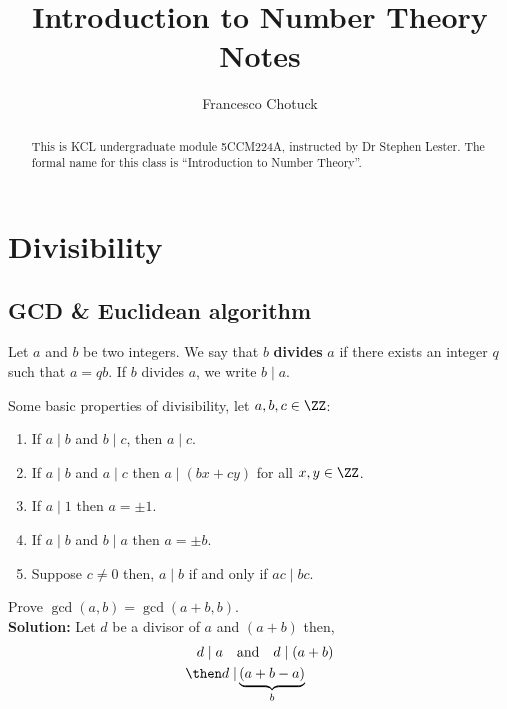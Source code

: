 \documentclass[12pt, a4paper]{article}
\title{Introduction to Number Theory Notes}
\date{}
\author{Francesco Chotuck}
\begin{document}
\maketitle

\begin{abstract}
    This is KCL undergraduate module 5CCM224A, instructed by Dr Stephen Lester. The formal name for this class is ``Introduction to Number Theory''.
\end{abstract}

\tableofcontents

\pagebreak

\section{Divisibility}

\subsection{GCD \& Euclidean algorithm}

\begin{definition}
    Let \(a\) and \(b\) be two integers. We say that \(b\) \textbf{divides} \(a\) if there exists an integer \(q\) such that \(a=qb\). If \(b\) divides \(a\), we write \(b \mid a\).
\end{definition}

\begin{mdthm}
    Some basic properties of divisibility, let \(a,b,c \in \ZZ\):
\begin{enumerate}
    \item If \(a\mid b\) and \(b\mid c\), then \(a\mid c\).
    \item If \(a\mid b\) and \(a\mid c\) then \(a\mid (bx+cy)\) for all \(x,y \in \ZZ\). 
    \item If \(a\mid 1\) then \(a =\pm 1\).
    \item If \(a\mid b\) and \(b\mid a\) then \(a=\pm b\).
    \item Suppose \(c\neq 0\) then, \(a\mid b\) if and only if \(ac\mid bc\).
\end{enumerate}
\end{mdthm}

\begin{example}
    Prove \(\gcd(a,b)=\gcd(a+b,b)\).\\
    \textbf{Solution:} Let \(d\) be a divisor of \(a\) and \((a+b)\) then,
    \[\begin{aligned}
        d\mid a \quad &\text{and} \quad d\mid (a+b) \\
        \then d \mid &\underbrace{(a+b-a)}_{b}
    \end{aligned}\]
\end{example}
\end{document}
